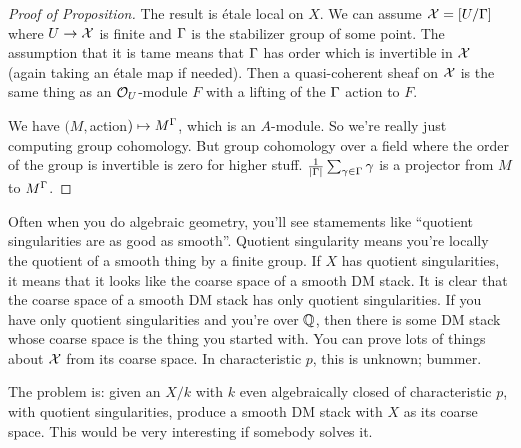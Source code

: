 \begin{proof}[Proof of Proposition]
  The result is \'etale local on $X$. We can assume $\mathcal{X}=[U/\Gamma]$
where $U\to \mathcal{X}$ is finite and $\Gamma$ is the stabilizer group of some
point. The assumption that it is tame means that $\Gamma$ has order
which is invertible in $\mathcal{X}$ (again taking an \'etale map if needed).
Then a quasi-coherent sheaf on $\mathcal{X}$ is the same thing as an
$\mathcal{O}_U$-module $F$ with a lifting of the $\Gamma$ action to $F$.

  We have $(M,$action$)\mapsto M^\Gamma$, which is an $A$-module. So
we're really just computing group cohomology. But group cohomology
over a field where the order of the group is invertible is zero for
higher stuff. $\frac{1}{|\Gamma|}\sum_{\gamma\in\Gamma} \gamma$ is a
projector from $M$ to $M^\Gamma$.
\end{proof}

Often when you do algebraic geometry, you'll see stamements like
``quotient singularities are as good as smooth''. Quotient
singularity means you're locally the quotient of a smooth thing by a
finite group. If $X$ has quotient singularities, it means that it
looks like the coarse space of a smooth DM stack. It is clear that
the coarse space of a smooth DM stack has only quotient
singularities. If you have only quotient singularities and you're
over $\mathbb{Q}$, then there is some DM stack whose coarse space is the
thing you started with. You can prove lots of things about $\mathcal{X}$ from
its coarse space. In characteristic $p$, this is unknown; bummer.

The problem is: given an $X/k$ with $k$ even algebraically closed of
characteristic $p$, with quotient singularities, produce a smooth DM
stack with $X$ as its coarse space. This would be very interesting if
somebody solves it.
